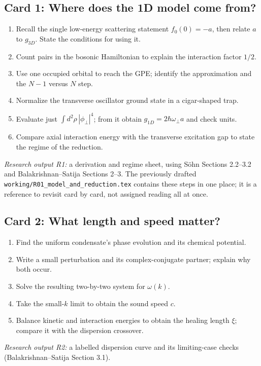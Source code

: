 \subsection{Card 1: Where does the 1D model come from?}
\begin{enumerate}[label=1.\arabic*.,leftmargin=2.5em]
\item Recall the single low-energy scattering statement $f_0(0)=-a$, then relate $a$ to $g_{3D}$. State the conditions for using it.
\item Count pairs in the bosonic Hamiltonian to explain the interaction factor $1/2$.
\item Use one occupied orbital to reach the GPE; identify the approximation and the $N-1$ versus $N$ step.
\item Normalize the transverse oscillator ground state in a cigar-shaped trap.
\item Evaluate just $\int d^2\rho\,|\phi_\perp|^4$; from it obtain $g_{1D}=2\hbar\omega_\perp a$ and check units.
\item Compare axial interaction energy with the transverse excitation gap to state the regime of the reduction.
\end{enumerate}
\noindent\emph{Research output R1:} a derivation and regime sheet, using S\"ohn Sections 2.2--3.2 and Balakrishnan--Satija Sections 2--3. The previously drafted \texttt{working/R01\_model\_and\_reduction.tex} contains these steps in one place; it is a reference to revisit card by card, not assigned reading all at once.

\subsection{Card 2: What length and speed matter?}
\begin{enumerate}[label=2.\arabic*.,leftmargin=2.5em]
\item Find the uniform condensate's phase evolution and its chemical potential.
\item Write a small perturbation and its complex-conjugate partner; explain why both occur.
\item Solve the resulting two-by-two system for $\omega(k)$.
\item Take the small-$k$ limit to obtain the sound speed $c$.
\item Balance kinetic and interaction energies to obtain the healing length $\xi$; compare it with the dispersion crossover.
\end{enumerate}
\noindent\emph{Research output R2:} a labelled dispersion curve and its limiting-case checks (Balakrishnan--Satija Section 3.1).

